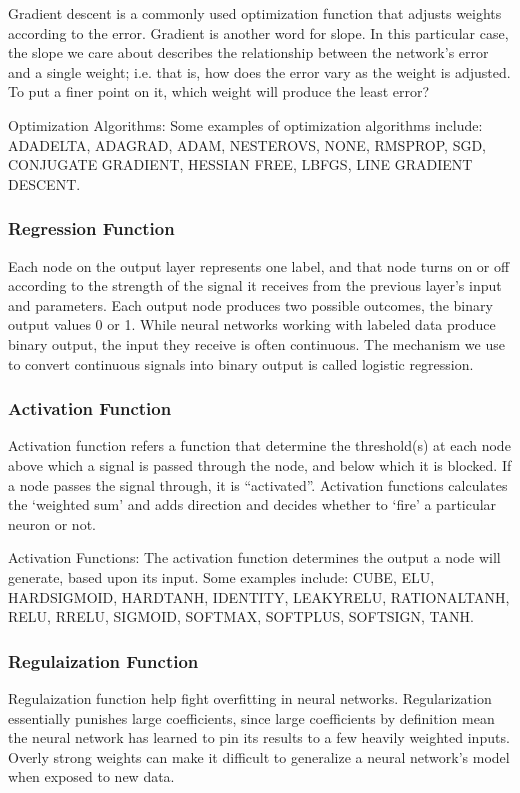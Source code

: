 \documentclass[10pt]{llncs}
\begin{document}
Gradient descent is a commonly used optimization function that adjusts weights according to the error. Gradient is another word for slope. In this particular case, the slope we care about describes the relationship between the network’s error and a single weight; i.e. that is, how does the error vary as the weight is adjusted. To put a finer point on it, which weight will produce the least error?

Optimization Algorithms: Some examples of optimization algorithms include: ADADELTA, ADAGRAD, ADAM, NESTEROVS, NONE, RMSPROP, SGD, CONJUGATE GRADIENT, HESSIAN FREE, LBFGS, LINE GRADIENT DESCENT.

\subsubsection{Regression Function}
Each node on the output layer represents one label, and that node turns on or off according to the strength of the signal it receives from the previous layer’s input and parameters. Each output node produces two possible outcomes, the binary output values 0 or 1. While neural networks working with labeled data produce binary output, the input they receive is often continuous. The mechanism we use to convert continuous signals into binary output is called logistic regression.

\subsubsection{Activation Function}
Activation function refers a function that determine the threshold(s) at each node above which a signal is passed through the node, and below which it is blocked. If a node passes the signal through, it is “activated”. Activation functions calculates the ‘weighted sum’ and adds direction and decides whether to ‘fire’ a particular neuron or not.

Activation Functions: The activation function determines the output a node will generate, based upon its input. Some examples include: CUBE, ELU, HARDSIGMOID, HARDTANH, IDENTITY, LEAKYRELU, RATIONALTANH, RELU, RRELU, SIGMOID, SOFTMAX, SOFTPLUS, SOFTSIGN, TANH.

\subsubsection{Regulaization Function}
Regulaization function help fight overfitting in neural networks. Regularization essentially punishes large coefficients, since large coefficients by definition mean the neural network has learned to pin its results to a few heavily weighted inputs. Overly strong weights can make it difficult to generalize a neural network’s model when exposed to new data.
\end{document}
